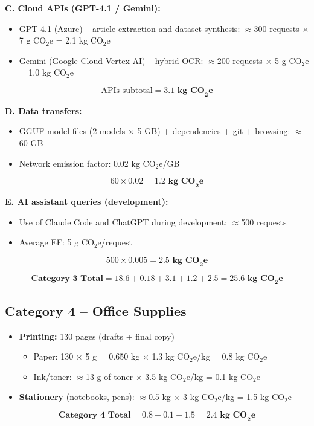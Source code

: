 \textbf{C. Cloud APIs (GPT-4.1 / Gemini):}
\begin{itemize}
    \item GPT-4.1 (Azure) -- article extraction and dataset synthesis: $\approx$300 requests $\times$ 7 g CO$_2$e = 2.1 kg CO$_2$e
    \item Gemini (Google Cloud Vertex AI) -- hybrid OCR: $\approx$200 requests $\times$ 5 g CO$_2$e = 1.0 kg CO$_2$e
\end{itemize}
\[
\text{APIs subtotal} = \mathbf{3.1\text{ kg CO}_2\text{e}}
\]

\textbf{D. Data transfers:}
\begin{itemize}
    \item GGUF model files (2 models $\times$ 5 GB) + dependencies + git + browsing: $\approx$60 GB
    \item Network emission factor: 0.02 kg CO$_2$e/GB
\end{itemize}
\[
60 \times 0.02 = \mathbf{1.2\text{ kg CO}_2\text{e}}
\]

\textbf{E. AI assistant queries (development):}
\begin{itemize}
    \item Use of Claude Code and ChatGPT during development: $\approx$500 requests
    \item Average EF: 5 g CO$_2$e/request
\end{itemize}
\[
500 \times 0.005 = \mathbf{2.5\text{ kg CO}_2\text{e}}
\]

\[
\textbf{Category 3 Total} = 18.6 + 0.18 + 3.1 + 1.2 + 2.5 = \mathbf{25.6\text{ kg CO}_2\text{e}}
\]

\subsection*{Category 4 -- Office Supplies}

\begin{itemize}
    \item \textbf{Printing:} 130 pages (drafts + final copy)
    \begin{itemize}
        \item Paper: 130 $\times$ 5 g = 0.650 kg $\times$ 1.3 kg CO$_2$e/kg = 0.8 kg CO$_2$e
        \item Ink/toner: $\approx$13 g of toner $\times$ 3.5 kg CO$_2$e/kg = 0.1 kg CO$_2$e
    \end{itemize}
    \item \textbf{Stationery} (notebooks, pens): $\approx$0.5 kg $\times$ 3 kg CO$_2$e/kg = 1.5 kg CO$_2$e
\end{itemize}
\[
\textbf{Category 4 Total} = 0.8 + 0.1 + 1.5 = \mathbf{2.4\text{ kg CO}_2\text{e}}
\]

